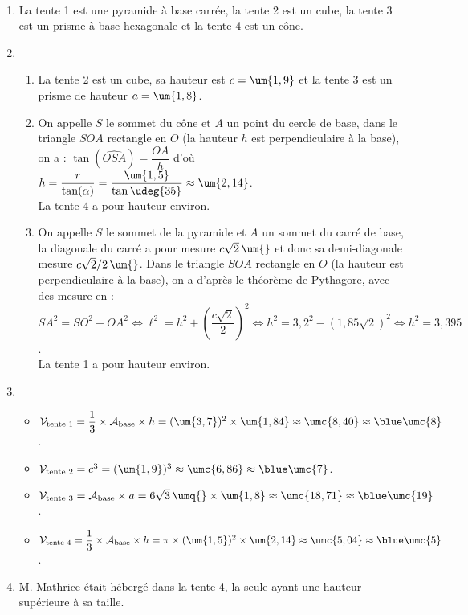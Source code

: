 \ \\ [-5mm]
   \begin{enumerate}
      \item La tente 1 est une {\blue pyramide} à base carrée, la tente 2 est un {\blue cube}, la tente 3 est un {\blue prisme} à base hexagonale et la tente 4 est un {\blue cône.}
      \item
         \begin{enumerate}
            \item La tente 2 est un cube, sa hauteur est {\blue $c =\um{1,9}$} et la tente 3 est un prisme de hauteur {\blue $a =\um{1,8}$}.
            \item On appelle $S$ le sommet du cône et $A$ un point du cercle de base, dans le triangle $SOA$ rectangle en $O$ (la hauteur $h$ est perpendiculaire à la base), on a : $\tan(\widehat{OSA}) =\dfrac{OA}{h}$ d'où $h =\dfrac{r}{\tan(\alpha)} =\dfrac{\um{1,5}}{\tan{\udeg{35}}} \approx\um{2,14}$. \\ [1mm]
               La tente 4 a pour {\blue hauteur } environ.
            \item On appelle $S$ le sommet de la pyramide et $A$ un sommet du carré de base, la diagonale du carré a pour mesure $c\sqrt{2}\,\um{}$ et donc sa demi-diagonale mesure $c\sqrt{2}/2\,\um{}$. Dans le triangle $SOA$ rectangle en $O$ (la hauteur est perpendiculaire à la base), on a d'après le théorème de Pythagore, avec des mesure en \um{} : \\
               $SA^2 =SO^2+OA^2 \iff \ell^2 =h^2+\left(\dfrac{c\sqrt{2}}{2}\right)^2 \iff h^2 =3,2^2-(1,85\sqrt2)^2 \iff h^2 =3,395$. \\ [1mm]
               La tente 1 a pour {\blue hauteur } environ.
         \end{enumerate}
      \setcounter{enumi}{2}
      \item
         \begin{itemize}
            \item $\mathcal{V}_{\text{tente 1}} =\dfrac13\times\mathcal{A}_{\text{base}}\times h=(\um{3,7})^2\times\um{1,84} \approx\umc{8,40} \approx{\blue\umc{8}}$. \smallskip
            \item $\mathcal{V}_{\text{tente 2}} =c^3=(\um{1,9})^3 \approx\umc{6,86} \approx{\blue \umc{7}}$.
            \item $\mathcal{V}_{\text{tente 3}} =\mathcal{A}_{\text{base}}\times a=6\sqrt3\,\umq{}\times\um{1,8} \approx\umc{18,71} \approx{\blue \umc{19}}$. \smallskip
            \item $\mathcal{V}_{\text{tente 4}} =\dfrac13\times\mathcal{A}_{\text{base}}\times h=\pi\times(\um{1,5})^2\times\um{2,14} \approx\umc{5,04} \approx{\blue \umc{5}}$. \smallskip
         \end{itemize}
      \item M. Mathrice était hébergé dans la {\blue tente 4}, la seule ayant une hauteur supérieure à sa taille.
   \end{enumerate}
